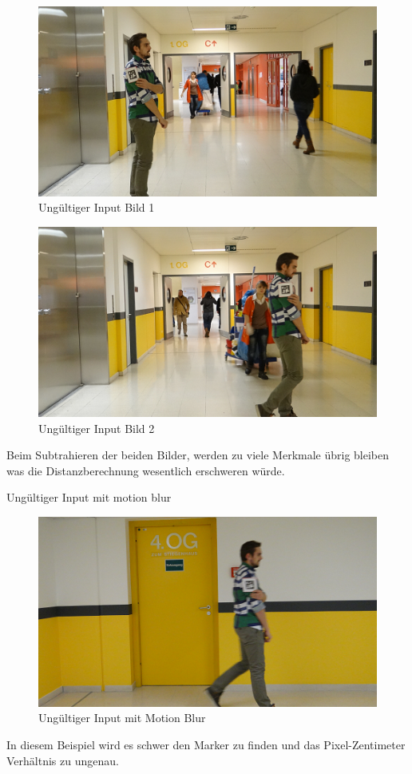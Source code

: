 \documentclass[deutsch]{scrartcl}
\begin{document}
\begin{figure}[ht]
	\centering
	\includegraphics{ungueltig1.png}
	\caption{Ungültiger Input Bild 1}
	\label{fig3}
\end{figure}
\begin{figure}[ht]
	\centering
	\includegraphics{ungueltig2.png}
	\caption{Ungültiger Input Bild 2}
	\label{fig4}
\end{figure}
Beim Subtrahieren der beiden Bilder, werden zu viele Merkmale übrig bleiben was die Distanzberechnung wesentlich erschweren würde.

Ungültiger Input mit motion blur

\begin{figure}[ht]
	\centering
	\includegraphics{ungueltig3.png}
	\caption{Ungültiger Input mit Motion Blur}
	\label{fig5}
\end{figure}
In diesem Beispiel wird es schwer den Marker zu finden und das Pixel-Zentimeter Verhältnis zu ungenau.
\end{document}
